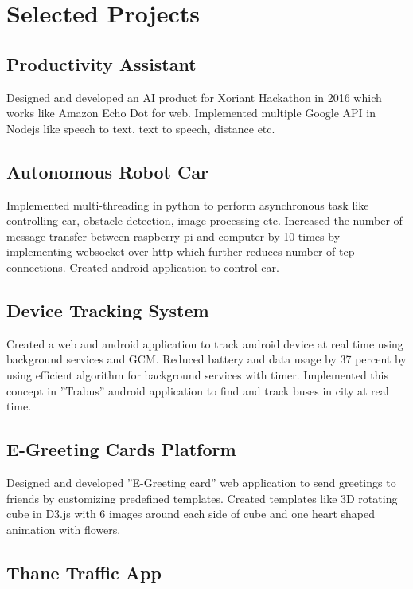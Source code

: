 \documentclass[letterpaper]{twentysecondcv} %
\begin{document}
\section{Selected Projects}

\subsection{Productivity Assistant}

Designed and developed an AI product for Xoriant Hackathon in 2016 which works like Amazon Echo Dot for web. Implemented multiple Google API in Nodejs like speech to text, text to speech, distance etc.

\subsection{Autonomous Robot Car}

Implemented multi-threading in python to perform asynchronous task like
controlling car, obstacle detection, image processing etc. Increased the number of message transfer between
raspberry pi and computer by 10 times by implementing websocket over http which further reduces number
of tcp connections. Created android application to control car.


\subsection{Device Tracking System}

Created a web and android application to track android device at real time
using background services and GCM. Reduced battery and data usage by 37 percent by using efficient
algorithm for background services with timer. Implemented this concept in ”Trabus” android application
to find and track buses in city at real time.


\subsection{E-Greeting Cards Platform}

Designed and developed ”E-Greeting card” web application
to send greetings to friends by customizing predefined templates. Created templates like 3D
rotating cube in D3.js with 6 images around each side of cube and one heart shaped animation with
flowers.

\subsection{Thane Traffic App}
\end{document}
